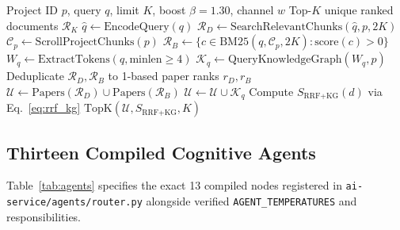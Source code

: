 \documentclass[conference]{IEEEtran}
\begin{document}
\begin{algorithm}[t]
\caption{Full-Corpus Hybrid RRF with KG Channel (\texttt{hybrid\_retriever.py})}
\label{alg:hybrid_kg}
\footnotesize
\begin{algorithmic}[1]
\Require Project ID $p$, query $q$, limit $K$, boost $\beta{=}1.30$, channel $w$
\Ensure Top-$K$ unique ranked documents $\mathcal{R}_K$
\State $\hat{q} \gets \text{EncodeQuery}(q)$ 
\State $\mathcal{R}_D \gets \text{SearchRelevantChunks}(\hat{q}, p, 2K)$
\State $\mathcal{C}_p \gets \text{ScrollProjectChunks}(p)$ 
\State $\mathcal{R}_B \gets \{c \in \text{BM25}(q, \mathcal{C}_p, 2K) : \text{score}(c) > 0\}$
\State $W_q \gets \text{ExtractTokens}(q, \text{minlen} \ge 4)$
\State $\mathcal{K}_q \gets \text{QueryKnowledgeGraph}(W_q, p)$ 
\State Deduplicate $\mathcal{R}_D, \mathcal{R}_B$ to 1-based paper ranks $r_D, r_B$
\State $\mathcal{U} \gets \text{Papers}(\mathcal{R}_D) \cup \text{Papers}(\mathcal{R}_B)$
  \State $\mathcal{U} \gets \mathcal{U} \cup \mathcal{K}_q$ 
\EndIf
{}
  \State Compute $S_{\text{RRF+KG}}(d)$ via Eq.~\eqref{eq:rrf_kg}
\EndFor
\State \Return $\text{TopK}(\mathcal{U}, S_{\text{RRF+KG}}, K)$
\end{algorithmic}
\end{algorithm}

\subsection{Thirteen Compiled Cognitive Agents}
Table~\ref{tab:agents} specifies the exact 13 compiled nodes registered in \texttt{ai-service/agents/router.py} alongside verified \texttt{AGENT\_TEMPERATURES} and responsibilities.
\end{document}
